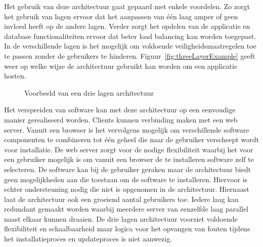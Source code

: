 Het gebruik van deze architectuur gaat gepaard met enkele voordelen.
Zo zorgt het gebruik van lagen ervoor dat het aanpassen van één laag amper of geen invloed heeft op de andere lagen.
Verder zorgt het opdelen van de applicatie en database functionaliteiten ervoor dat beter load balancing kan worden toegepast.
In de verschillende lagen is het mogelijk om voldoende veiligheidsmaatregelen toe te passen zonder de gebruikers te hinderen.
Figuur~\vref{fig:threeLayerExample} geeft weer op welke wijze de architectuur gebruikt kan worden om een applicatie hosten.

\begin{figure}[!ht]
\centering
{}
\caption{Voorbeeld van een drie lagen architectuur \citep{hanson2000client}}
\label{fig:threeLayerExample}
\end{figure}

Het verspreiden van software kan met deze architectuur op een eenvoudige manier gerealiseerd worden.
Clients kunnen verbinding maken met een web server.
Vanuit een browser is het vervolgens mogelijk om verschillende software componenten te combineren tot één geheel die naar de gebruiker verscheept wordt voor installatie.
De web server zorgt voor de nodige flexibiliteit waarbij het voor een gebruiker mogelijk is om vanuit een browser de te installeren software zelf te selecteren.
De software kan bij de gebruiker geraken maar de architectuur biedt geen mogelijkheden aan die toestaan om de software te installeren.
Hiervoor is echter ondersteuning nodig die niet is opgenomen in de architectuur.
Hiernaast laat de architectuur ook een groeiend aantal gebruikers toe.
Iedere laag kan redundant gemaakt worden waarbij meerdere server van eenzelfde laag parallel naast elkaar kunnen draaien.
De drie lagen architectuur voorziet voldoende flexibiliteit en schaalbaarheid maar logica voor het opvangen van fouten tijdens het installatieproces en updateproces is niet aanwezig.


